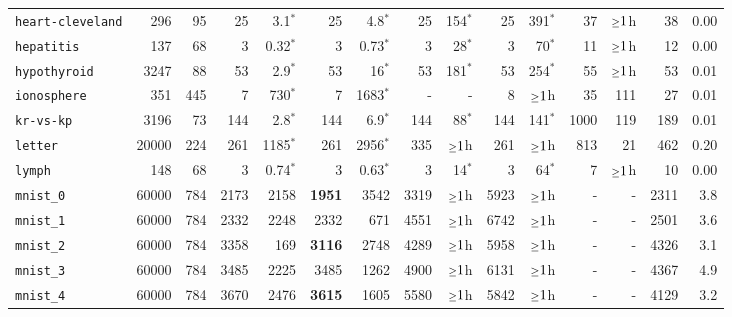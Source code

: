 \begin{tabular}{lccrrrrrrrrrrrr}
\texttt{heart-cleveland} & \multicolumn{1}{r}{296} & \multicolumn{1}{r}{95}  & 25 & 3.1$^*$ & 25 & 4.8$^*$ & 25 & 154$^*$ & 25 & 391$^*$ & 37 & $\mathsmaller{\geq}1$h & 38 & 0.00\\
\texttt{hepatitis} & \multicolumn{1}{r}{137} & \multicolumn{1}{r}{68}  & 3 & 0.32$^*$ & 3 & 0.73$^*$ & 3 & 28$^*$ & 3 & 70$^*$ & 11 & $\mathsmaller{\geq}1$h & 12 & 0.00\\
\texttt{hypothyroid} & \multicolumn{1}{r}{3247} & \multicolumn{1}{r}{88}  & 53 & 2.9$^*$ & 53 & 16$^*$ & 53 & 181$^*$ & 53 & 254$^*$ & 55 & $\mathsmaller{\geq}1$h & 53 & 0.01\\
\texttt{ionosphere} & \multicolumn{1}{r}{351} & \multicolumn{1}{r}{445}  & 7 & 730$^*$ & 7 & 1683$^*$ & - & - & 8 & $\mathsmaller{\geq}1$h & 35 & 111 & 27 & 0.01\\
\texttt{kr-vs-kp} & \multicolumn{1}{r}{3196} & \multicolumn{1}{r}{73}  & 144 & 2.8$^*$ & 144 & 6.9$^*$ & 144 & 88$^*$ & 144 & 141$^*$ & 1000 & 119 & 189 & 0.01\\
\texttt{letter} & \multicolumn{1}{r}{20000} & \multicolumn{1}{r}{224}  & 261 & 1185$^*$ & 261 & 2956$^*$ & 335 & $\mathsmaller{\geq}1$h & 261 & $\mathsmaller{\geq}1$h & 813 & 21 & 462 & 0.20\\
\texttt{lymph} & \multicolumn{1}{r}{148} & \multicolumn{1}{r}{68}  & 3 & 0.74$^*$ & 3 & 0.63$^*$ & 3 & 14$^*$ & 3 & 64$^*$ & 7 & $\mathsmaller{\geq}1$h & 10 & 0.00\\
\texttt{mnist\_0} & \multicolumn{1}{r}{60000} & \multicolumn{1}{r}{784}  & 2173 & 2158 & \textbf{1951} & 3542 & 3319 & $\mathsmaller{\geq}1$h & 5923 & $\mathsmaller{\geq}1$h & - & - & 2311 & 3.8\\
\texttt{mnist\_1} & \multicolumn{1}{r}{60000} & \multicolumn{1}{r}{784}  & 2332 & 2248 & 2332 & 671 & 4551 & $\mathsmaller{\geq}1$h & 6742 & $\mathsmaller{\geq}1$h & - & - & 2501 & 3.6\\
\texttt{mnist\_2} & \multicolumn{1}{r}{60000} & \multicolumn{1}{r}{784}  & 3358 & 169 & \textbf{3116} & 2748 & 4289 & $\mathsmaller{\geq}1$h & 5958 & $\mathsmaller{\geq}1$h & - & - & 4326 & 3.1\\
\texttt{mnist\_3} & \multicolumn{1}{r}{60000} & \multicolumn{1}{r}{784}  & 3485 & 2225 & 3485 & 1262 & 4900 & $\mathsmaller{\geq}1$h & 6131 & $\mathsmaller{\geq}1$h & - & - & 4367 & 4.9\\
\texttt{mnist\_4} & \multicolumn{1}{r}{60000} & \multicolumn{1}{r}{784}  & 3670 & 2476 & \textbf{3615} & 1605 & 5580 & $\mathsmaller{\geq}1$h & 5842 & $\mathsmaller{\geq}1$h & - & - & 4129 & 3.2\\

\end{tabular}
